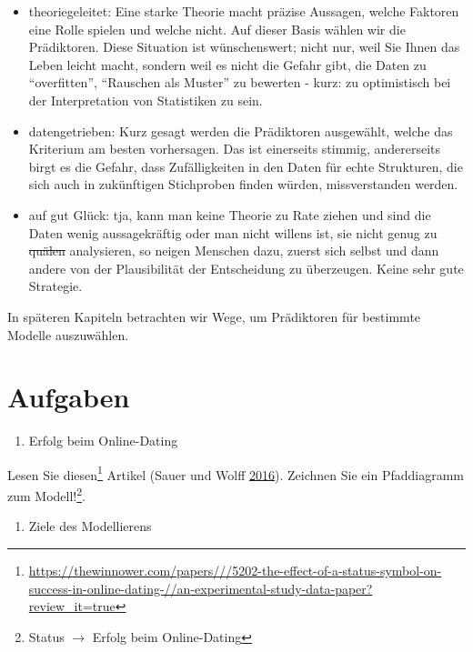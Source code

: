 \documentclass[12pt,ngerman,]{book}
\providecommand{\tightlist}{%
  \setlength{\itemsep}{0pt}\setlength{\parskip}{0pt}}
\let\rmarkdownfootnote\footnote%
\def\footnote{\protect\rmarkdownfootnote}
\begin{document}
\begin{itemize}
\item
  theoriegeleitet: Eine starke Theorie macht präzise Aussagen, welche
  Faktoren eine Rolle spielen und welche nicht. Auf dieser Basis wählen
  wir die Prädiktoren. Diese Situation ist wünschenswert; nicht nur,
  weil Sie Ihnen das Leben leicht macht, sondern weil es nicht die
  Gefahr gibt, die Daten zu ``overfitten'', ``Rauschen als Muster'' zu
  bewerten - kurz: zu optimistisch bei der Interpretation von
  Statistiken zu sein.
\item
  datengetrieben: Kurz gesagt werden die Prädiktoren ausgewählt, welche
  das Kriterium am besten vorhersagen. Das ist einerseits stimmig,
  andererseits birgt es die Gefahr, dass Zufälligkeiten in den Daten für
  echte Strukturen, die sich auch in zukünftigen Stichproben finden
  würden, missverstanden werden.
\item
  auf gut Glück: tja, kann man keine Theorie zu Rate ziehen und sind die
  Daten wenig aussagekräftig oder man nicht willens ist, sie nicht genug
  zu \sout{quälen} analysieren, so neigen Menschen dazu, zuerst sich
  selbst und dann andere von der Plausibilität der Entscheidung zu
  überzeugen. Keine sehr gute Strategie.
\end{itemize}

In späteren Kapiteln betrachten wir Wege, um Prädiktoren für bestimmte
Modelle auszuwählen.

\section{Aufgaben}\label{aufgaben-11}

\begin{enumerate}
\def\labelenumi{\arabic{enumi}.}
\tightlist
\item
  Erfolg beim Online-Dating
\end{enumerate}

Lesen Sie diesen\footnote{\url{https://thewinnower.com/papers///5202-the-effect-of-a-status-symbol-on-success-in-online-dating-//an-experimental-study-data-paper?review_it=true}}
Artikel (Sauer und Wolff \protect\hyperlink{ref-sauer_wolff}{2016}).
Zeichnen Sie ein Pfaddiagramm zum Modell!\footnote{Status
  \(\rightarrow\) Erfolg beim Online-Dating}.

\begin{enumerate}
\def\labelenumi{\arabic{enumi}.}
\setcounter{enumi}{1}
\tightlist
\item
  Ziele des Modellierens
\end{enumerate}
\end{document}
